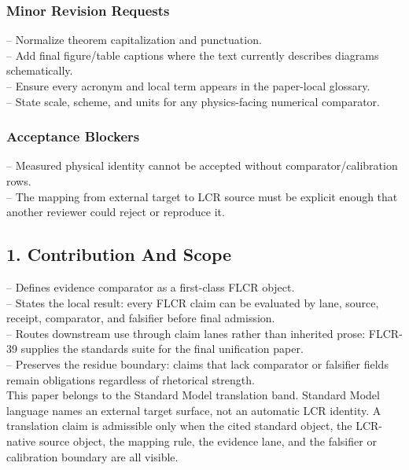 \documentclass[11pt]{article}
\begin{document}
\subsubsection*{Minor Revision Requests}

\noindent{}-- Normalize theorem capitalization and punctuation.\\
\noindent{}-- Add final figure/table captions where the text currently describes diagrams schematically.\\
\noindent{}-- Ensure every acronym and local term appears in the paper-local glossary.\\
\noindent{}-- State scale, scheme, and units for any physics-facing numerical comparator.\\

\subsubsection*{Acceptance Blockers}

\noindent{}-- Measured physical identity cannot be accepted without comparator/calibration rows.\\
\noindent{}-- The mapping from external target to LCR source must be explicit enough that another reviewer could reject or reproduce it.\\


\subsection*{1. Contribution And Scope}

\noindent{}-- Defines evidence comparator as a first-class FLCR object.\\
\noindent{}-- States the local result: every FLCR claim can be evaluated by lane, source, receipt, comparator, and falsifier before final admission.\\
\noindent{}-- Routes downstream use through claim lanes rather than inherited prose: FLCR-39 supplies the standards suite for the final unification paper.\\
\noindent{}-- Preserves the residue boundary: claims that lack comparator or falsifier fields remain obligations regardless of rhetorical strength.\\

This paper belongs to the Standard Model translation band. Standard Model language names an external target surface, not an automatic LCR identity. A translation claim is admissible only when the cited standard object, the LCR-native source object, the mapping rule, the evidence lane, and the falsifier or calibration boundary are all visible.
\end{document}

